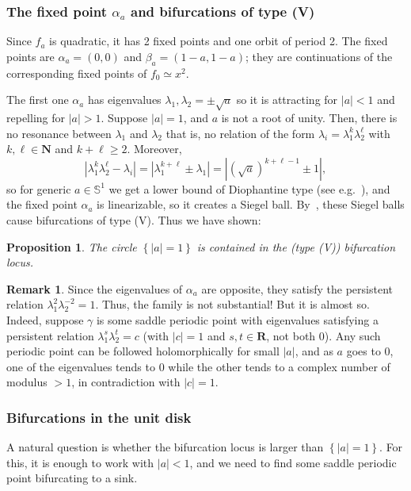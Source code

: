 \documentclass[oneside, 12pt]{amsart}
\newcommand{\set}[1]{\left\{#1\right\}}
\newcommand{\abs}[1]{\left\vert#1\right\vert}
\newcommand{\R}{\mathbf{R}}
\newcommand{\N}{\mathbf{N}}
\theoremstyle{plain}
\newtheorem{pro}[thm]{Proposition}
\theoremstyle{definition}
\newtheorem{rem}[thm]{Remark}
\numberwithin{equation}{section}       %
\numberwithin{equation}{section}       %
\begin{document}
\begin{vlongue}
\subsubsection{The fixed point $\alpha_a$ and bifurcations of type (V)}\label{subsub:alpha}  Since $f_a$ is quadratic, it has  2 fixed points and one   orbit of period 2. The fixed points are $\alpha_a=(0,0)$ and $\beta_a=(1-a, 1-a)$; they are continuations of the corresponding fixed points of $f_0\simeq  x^2$.

The first one $\alpha_a$ has  eigenvalues $\lambda_1, \lambda_2=\pm\sqrt{a}$ so it is attracting for $\abs{a}<1$ and repelling for $\abs{a}>1$. Suppose $\abs{a}=1$, and $a$ is not a root of unity. Then, there is no resonance between $\lambda_1$ and $\lambda_2$ that is,  no relation of the form 
  $\lambda_i = \lambda_1^k \lambda_2^\ell$ with $k, \ell\in \N$ and $k+\ell\geq 2$. Moreover, 
  \[
  \abs{\lambda_1^k \lambda_2^\ell  - \lambda_i} = \abs{\lambda_1^{k+\ell} \pm\lambda_1} =  \abs{(\sqrt{a})^{k+\ell-1} \pm 1},
  \] so for generic $a\in \mathbb{S}^1$ we get a lower bound 
of %
Diophantine
type (see e.g.~\cite{zehnder}), and the fixed point $\alpha_a$ is linearizable, 
so it creates a Siegel ball. 
  By~\cite[Lem. 4.11]{tangencies}, 
  these Siegel balls cause bifurcations of type (V).  Thus we have shown:

\begin{pro}
The circle $\set{\abs{a}=1}$ is contained in the (type (V)) bifurcation locus. 
\end{pro}  

\begin{rem}
Since the eigenvalues of $\alpha_a$ are opposite, they satisfy the persistent relation $\lambda_1^2\lambda_2^{-2}=1$. Thus, the family is not substantial! But it is almost so. Indeed, suppose $\gamma$ is some saddle periodic point  with eigenvalues satisfying a persistent relation  $\lambda_1^s\lambda_2^t =c$ (with $\abs{c}=1$  and $s,t\in \R$, not both $0$). Any such  periodic point can be followed holomorphically for small 
$\abs{a}$, and as $a$ goes to $0$, one of the eigenvalues tends to $0$ while the other tends to a complex number of modulus $>1$, in contradiction  with $\abs{c}=1$.
\end{rem}


 
  
  
\subsubsection{Bifurcations in the unit disk}  A natural question is whether the bifurcation locus is larger  than   $\set{\abs{a}=1}$. 
For this, it is enough to work with $\abs{a}<1$, 
and we  need to find some   saddle periodic point  
 bifurcating  to a sink. 
 

\end{vlongue}
\end{document}
